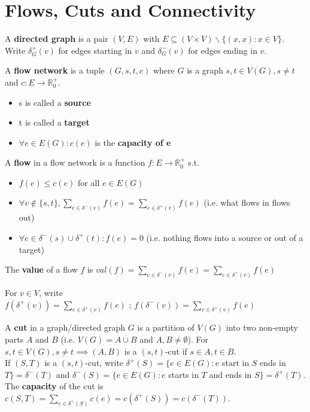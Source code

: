 \section{Flows, Cuts and Connectivity}
\begin{definition}
    A \textbf{directed graph} is a pair $(V,E)$ with $E\subseteq (V\times V)\backslash\{(x,x):x\in V\}$. Write $\delta_G^+(v)$ for edges starting in $v$ and $\delta_G ^-(v)$ for edges ending in $v$.
\end{definition}
\vspace{0.5cm}
\begin{definition}
    A \textbf{flow network} is a tuple $(G,s,t,c)$ where $G$ is a graph $s,t\in V(G),s\neq t$ and $c:E\to\mathbb{R}_0^+$.
    \begin{itemize}
        \item s is called a \textbf{source}
        \item t is called a \textbf{target}
        \item $\forall e\in E(G):c(e)$ is the \textbf{capacity of e}
    \end{itemize}
    A \textbf{flow} in a flow network is a function $f:E\to\mathbb{R}^+_0$ s.t.
    \begin{itemize}
        \item $f(e)\leq c(e)$ for all $e\in E(G)$
        \item $\forall v\notin\{s,t\},\sum\limits_{e\in\delta^-(v)} f(e)=\sum\limits_{e\in\delta^+(v)}f(e)$ (i.e. what flows in flows out)
        \item $\forall e\in\delta^-(s)\cup\delta^+(t):f(e)=0$ (i.e. nothing flows into a source or out of a target)
    \end{itemize}
    The \textbf{value} of a flow $f$ is $val(f)=\sum\limits_{e\in\delta^-(v)} f(e)=\sum\limits_{e\in\delta^+(v)}f(e)$
\end{definition}
\begin{remark}
    For $v\in V$, write $f(\delta^+(v))=\sum\limits_{e\in\delta^+(v)} f(e) \text{ ; }f(\delta^-(v))=\sum\limits_{e\in\delta^+(v)}f(e)$
\end{remark}
\vspace{0.5cm}
\begin{definition}
    A \textbf{cut} in a graph/directed graph $G$ is a partition of $V(G)$ into two non-empty parts $A$ and $B$ (i.e. $V(G)=A\stackrel{.}{\cup} B$ and $A,B\neq\emptyset$). For $s,t\in V(G),s\neq t \implies (A,B)$ is a $(s,t)$-cut if $s\in A,t\in B$.\\
    If $(S,T)$ is a $(s,t)$-cut, write $\delta^+(S)=\{e\in E(G):e$ start in $S$ ends in $T\}=\delta^-(T)$ and $\delta ^-(S)=\{e\in E(G): e$ starts in $T$ and ends in $S\}=\delta^+(T)$.\\
    The \textbf{capacity} of the cut is $c(S,T)=\sum\limits_{e\in \delta^+(S)}c(e)=c(\delta^+(S))=c(\delta^-(T))$.
\end{definition}
